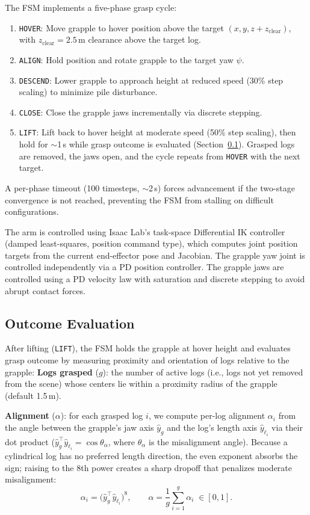 \documentclass[conference]{IEEEtran}
\begin{document}
The FSM implements a five-phase grasp cycle:
\begin{enumerate}
    \item \texttt{HOVER}: Move grapple to hover position above the target $(x, y, z + z_{\text{clear}})$, with $z_{\text{clear}} = 2.5$\,m clearance above the target log.
    \item \texttt{ALIGN}: Hold position and rotate grapple to the target yaw $\psi$.
    \item \texttt{DESCEND}: Lower grapple to approach height at reduced speed (30\% step scaling) to minimize pile disturbance.
    \item \texttt{CLOSE}: Close the grapple jaws incrementally via discrete stepping.
    \item \texttt{LIFT}: Lift back to hover height at moderate speed (50\% step scaling), then hold for $\sim$1\,s while grasp outcome is evaluated (Section~\ref{sec:outcome}). Grasped logs are removed, the jaws open, and the cycle repeats from \texttt{HOVER} with the next target.
\end{enumerate}
A per-phase timeout (100 timesteps, $\sim$2\,s) forces advancement if the two-stage convergence is not reached, preventing the FSM from stalling on difficult configurations.

The arm is controlled using Isaac Lab's task-space Differential IK controller~\cite{mittal2023orbit} (damped least-squares, position command type), which computes joint position targets from the current end-effector pose and Jacobian.
The grapple yaw joint is controlled independently via a PD position controller.
The grapple jaws are controlled using a PD velocity law with saturation and discrete stepping to avoid abrupt contact forces.

\subsection{Outcome Evaluation}
\label{sec:outcome}
After lifting (\texttt{LIFT}), the FSM holds the grapple at hover height and evaluates grasp outcome by measuring proximity and orientation of logs relative to the grapple:
\textbf{Logs grasped} ($g$): the number of active logs (i.e., logs not yet removed from the scene) whose centers lie within a proximity radius of the grapple (default 1.5\,m).

\textbf{Alignment} ($\alpha$): for each grasped log $i$, we compute per-log alignment $\alpha_i$ from the angle between the grapple's jaw axis $\hat{y}_g$ and the log's length axis $\hat{y}_{\ell_i}$ via their dot product ($\hat{y}_g^\top \hat{y}_{\ell_i} = \cos\theta_\alpha$, where $\theta_\alpha$ is the misalignment angle).
Because a cylindrical log has no preferred length direction, the even exponent absorbs the sign; raising to the 8th power creates a sharp dropoff that penalizes moderate misalignment:
\begin{equation}
    \alpha_i = \big(\hat{y}_g^\top \hat{y}_{\ell_i}\big)^{8}, \qquad \alpha = \frac{1}{g}\sum_{i=1}^{g} \alpha_i \;\in [0,1].
\end{equation}
\end{document}
